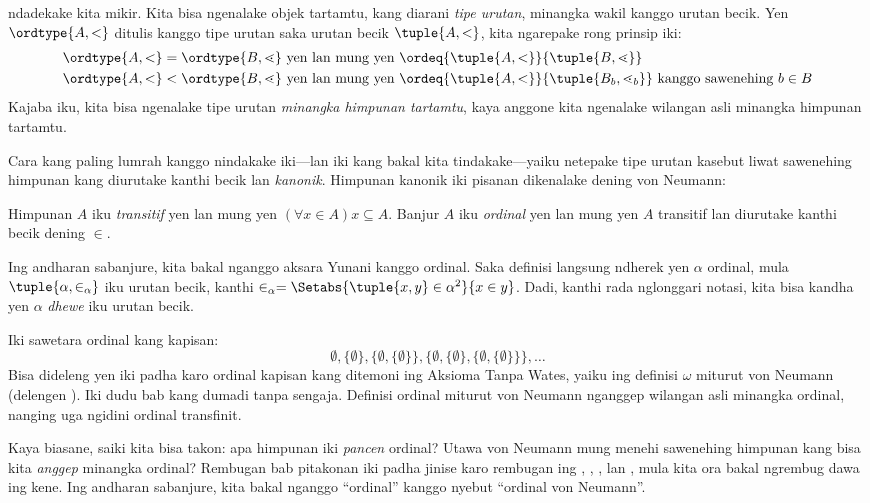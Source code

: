\documentclass[../../../include/open-logic-section]{subfiles}
\begin{document}

ndadekake kita mikir. Kita bisa ngenalake objek tartamtu,
kang diarani \emph{tipe urutan}, minangka wakil
kanggo urutan becik. Yen $\ordtype{A, <}$ ditulis
kanggo tipe urutan saka urutan becik $\tuple{A, <}$,
kita ngarepake rong prinsip iki:
\begin{align*}
	\ordtype{A, <} = \ordtype{B, \lessdot} & 
	\text{ yen lan mung yen } \ordeq{\tuple{A, <}}{\tuple{B, \lessdot}}\\
	\ordtype{A, <} < \ordtype{B, \lessdot}&
	\text{ yen lan mung yen }\ordeq{\tuple{A, <}}{\tuple{B_b, \lessdot_b}}\text{ kanggo sawenehing }b \in B
\end{align*}
Kajaba iku, kita bisa ngenalake tipe urutan
\emph{minangka himpunan tartamtu}, kaya anggone kita
ngenalake wilangan asli minangka himpunan tartamtu.

Cara kang paling lumrah kanggo nindakake iki---lan
iki kang bakal kita tindakake---yaiku netepake tipe
urutan kasebut liwat sawenehing himpunan kang diurutake
kanthi becik lan \emph{kanonik}. Himpunan kanonik iki
pisanan dikenalake dening von Neumann:

\begin{defn}
Himpunan $A$ iku \emph{transitif} yen lan mung yen
$(\forall x \in A)x \subseteq A$. Banjur $A$ iku
\emph{ordinal} yen lan mung yen $A$ transitif lan
diurutake kanthi becik dening $\in$.
\end{defn}
\noindent
Ing andharan sabanjure, kita bakal nganggo aksara Yunani
kanggo ordinal. Saka definisi langsung ndherek yen
$\alpha$ ordinal, mula $\tuple{\alpha, \in_\alpha}$
iku urutan becik, kanthi $\in_\alpha =
\Setabs{\tuple{x, y} \in \alpha^2}{x \in y}$.
Dadi, kanthi rada nglonggari notasi, kita bisa kandha
yen $\alpha$ \emph{dhewe} iku urutan becik.

Iki sawetara ordinal kang kapisan:
\[
	\emptyset, \{\emptyset\}, 
	\{\emptyset, \{\emptyset\}\}, 
	\{\emptyset, \{\emptyset\}, \{\emptyset, \{\emptyset\}\}\}, \ldots
\]
Bisa dideleng yen iki padha karo ordinal
kapisan kang ditemoni ing Aksioma Tanpa Wates, yaiku
ing definisi $\omega$ miturut von Neumann (delengen
). Iki dudu
bab kang dumadi tanpa sengaja. Definisi ordinal miturut von Neumann
nganggep wilangan asli minangka ordinal, nanging uga
ngidini ordinal transfinit.

Kaya biasane, saiki kita bisa takon: apa himpunan iki
\emph{pancen} ordinal? Utawa von Neumann mung menehi
sawenehing himpunan kang bisa kita \emph{anggep}
minangka ordinal? Rembugan bab pitakonan iki padha
jinise karo rembugan ing ,
,
, lan
, mula kita ora bakal
ngrembug dawa ing kene. Ing andharan sabanjure, kita bakal
nganggo ``ordinal'' kanggo nyebut ``ordinal von Neumann''.
\end{document}
